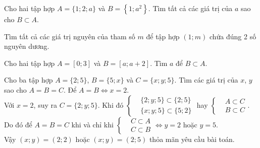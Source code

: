\begin{baitap}
	Cho hai tập hợp $A=\{1 ; 2 ; a\}$ và $B=\left\{1 ; a^{2}\right\}$. Tìm tất cả các giá trị của $a$ sao cho $B \subset A$.
\end{baitap}

\begin{baitap}%
	Tìm tất cả các giá trị nguyên của tham số  $m$ để tập hợp $\left(1;m\right)$ chứa đúng 2 số nguyên dương.
\end{baitap}


\begin{baitap}%
	Cho hai tập hợp $A=[0;3]$ và $B=[a;a+2]$. Tìm $a$ để $B\subset A$.
\end{baitap}

\begin{baitap}%
	Cho ba tập hợp $A=\{2;5\}$, $B=\{5;x\}$ và $C=\{x;y;5\}$. Tìm các giá trị của $x$, $y$ sao cho $A=B=C$.
	\loigiai
	{
		Để $A=B \Leftrightarrow x=2$.\\
		Với $x=2$, suy ra $C=\{2;y;5\}$. Khi đó $\left\{\begin{aligned}
			&\{2;y;5\}\subset \{2;5\}\\
			&\{x;y;5\}\subset \{5;2\}
		\end{aligned}\right. $ hay $\left\{\begin{aligned}
			&A\subset C\\
			&B\subset C
		\end{aligned}\right. $.\\
		Do đó để $A=B=C$ khi và chỉ khi $\left\{\begin{aligned}
			&C\subset A\\
			&C\subset B
		\end{aligned}\right. \Leftrightarrow y=2$ hoặc $y=5$.\\
		Vậy $(x;y)=(2;2)$ hoặc $(x;y)=(2;5)$ thỏa mãn yêu cầu bài toán.
	}
	
\end{baitap}

